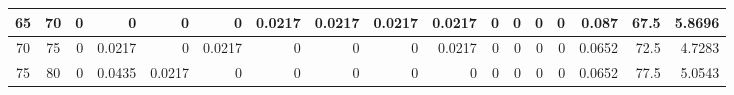 \begin{table}[ht]
\begin{adjustbox}{width = \textwidth, center}
\begin{tabular}{|cc|r|r|r|r|r|r|r|r|r|r|r|r|r|r|r|}
            \cellcolor[HTML]{C8E4BE}65             & \cellcolor[HTML]{D9EAD3}70             & \cellcolor[HTML]{FFFFFF}0                      & \cellcolor[HTML]{FFFFFF}0                      & \cellcolor[HTML]{FFFFFF}0                      & \cellcolor[HTML]{FFFFFF}0                      & \cellcolor[HTML]{C7E9D8}0.0217                 & \cellcolor[HTML]{C7E9D8}0.0217                 & \cellcolor[HTML]{C7E9D8}0.0217                 & \cellcolor[HTML]{C7E9D8}0.0217                  & \cellcolor[HTML]{FFFFFF}0                       & \cellcolor[HTML]{FFFFFF}0                       & \cellcolor[HTML]{FFFFFF}0                       & \cellcolor[HTML]{FFFFFF}0                       & \cellcolor[HTML]{D9D2E9}0.087                                                   & \cellcolor[HTML]{D9D2E9}67.5                                            & \cellcolor[HTML]{D9D2E9}5.8696                                                                   \\ \hline
            \rowcolor[HTML]{FFFFFF} 
            \cellcolor[HTML]{C8E4BE}70             & \cellcolor[HTML]{D9EAD3}75             & 0                                              & \cellcolor[HTML]{C7E9D8}0.0217                 & 0                                              & \cellcolor[HTML]{C7E9D8}0.0217                 & 0                                              & 0                                              & 0                                              & \cellcolor[HTML]{C7E9D8}0.0217                  & 0                                               & 0                                               & 0                                               & 0                                               & \cellcolor[HTML]{D9D2E9}0.0652                                                  & \cellcolor[HTML]{D9D2E9}72.5                                            & \cellcolor[HTML]{D9D2E9}4.7283                                                                   \\ \hline
            \rowcolor[HTML]{FFFFFF} 
            \cellcolor[HTML]{C8E4BE}75             & \cellcolor[HTML]{D9EAD3}80             & 0                                              & \cellcolor[HTML]{8FD2B1}0.0435                 & \cellcolor[HTML]{C7E9D8}0.0217                 & 0                                              & 0                                              & 0                                              & 0                                              & 0                                               & 0                                               & 0                                               & 0                                               & 0                                               & \cellcolor[HTML]{D9D2E9}0.0652                                                  & \cellcolor[HTML]{D9D2E9}77.5                                            & \cellcolor[HTML]{D9D2E9}5.0543                                                                   \\ \hline

\end{tabular}
\end{adjustbox}
\end{table}

